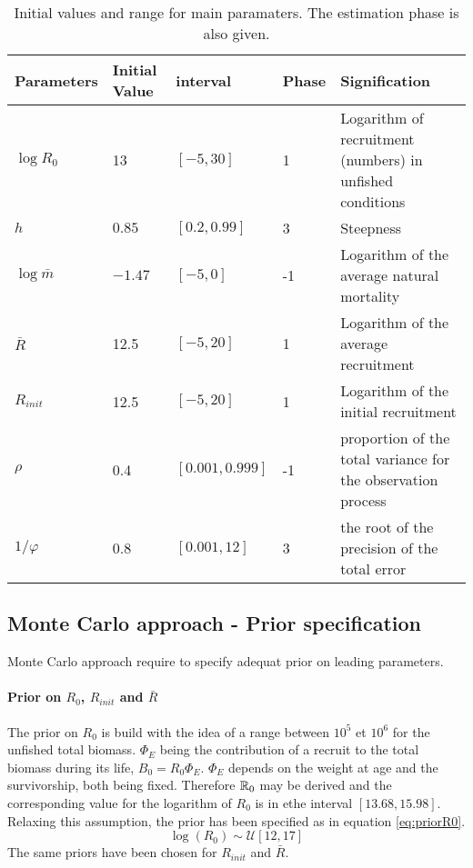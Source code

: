 \begin{table}[ht]
\centering
\begin{tabular}{p{2.1cm}p{2.1cm}p{2.2cm}p{2cm}p{6cm}}
  \hline
Parameters & Initial Value & interval & Phase & Signification  \\ \hline
 $\log{R_0}$ & 13  & $[-5,30]$ & 1 & Logarithm of recruitment (numbers) in unfished conditions\\
 $h$ & $0.85$ & $[0.2, 0.99]$ & 3 &  Steepness \\
$\log{\bar{m}}$ & $-1.47$ & $[-5,0]$ &-1 & Logarithm of the average natural mortality\\
$\bar{R}$& 12.5	& $[-5,	20]$ &	1	 & Logarithm of the average recruitment\\
$R_{init}$ & 12.5&	$[-5,	20]$ &	1	 & Logarithm of the initial recruitment\\
$\rho$ & 0.4	& $[0.001,0.999]$ & -1 & proportion of the total variance for the observation process \\
$1/\varphi$ & 0.8 &	$[0.001,	12]$ & 	3 & the root of the precision of the total error \\
\hline
\end{tabular}
\caption{Initial values and range for main paramaters. The estimation phase is also given.}
\label{table:initial}
\end{table}


\subsection{Monte Carlo approach - Prior specification}
Monte Carlo approach require to specify adequat prior on leading parameters.
\paragraph{Prior on $R_0$, $R_{init}$ and $\bar{R}$}
The prior on $R_0$ is build with the idea of a range between $10^5$ et $10^6$ for the unfished total biomass. $\Phi_E$ being the contribution of a recruit to the total biomass during its life, 
$B_0=R_0\Phi_E$. $\Phi_E$ depends on the weight at age and the survivorship, both being fixed. Therefore $\mathbb{R}_0$ may be derived and the corresponding value for the logarithm of $R_0$ is in ethe interval $[13.68, 15.98]$. Relaxing this assumption, 
the prior has been specified as in equation \ref{eq:priorR0}.
\begin{equation}
\log(R_0) \sim \mathcal{U}[12, 17] 
\label{eq:priorR0}
\end{equation}
The same priors have been chosen for $R_{init}$ and $\bar{R}$. 


